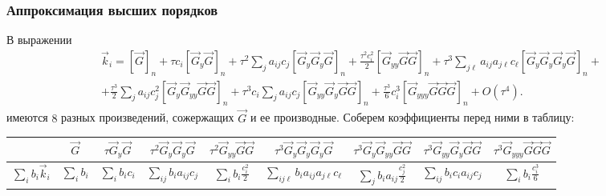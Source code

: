 \documentclass[professionalfonts,compress,unicode,aspectratio=169]{beamer}
\begin{document}
\begin{frame}\frametitle{Аппроксимация высших порядков}
	В выражении
	\begin{multline*}
	\vec k_i = [\vec G]_n + \tau c_i [\vec G_y\vec G]_n + \tau^2 \sum_j a_{ij} c_j [\vec
G_y \vec G_y \vec G]_n + \frac{\tau^2 c_i^2}{2} [\vec G_{yy} \vec G\vec G]_n +
	\tau^3 \sum_{j\ell} a_{ij} a_{j\ell} c_\ell [\vec G_y \vec G_y \vec G_y \vec
G]_n + \\ +
	\frac{\tau^3}{2} \sum_{j} a_{ij} c_j^2 [\vec G_y \vec G_{yy} \vec G \vec
G]_n +
	\tau^3 c_i \sum_{j} a_{ij} c_j [\vec G_{yy} \vec G_y \vec G \vec G]_n
	+ \frac{\tau^3}{6} c_i^3 [\vec G_{yyy} \vec G \vec G \vec G]_n + O(\tau^4).
	\end{multline*}
	имеются $8$ разных произведений, сожержащих $\vec G$ и ее производные. Соберем
коэффициенты перед ними в таблицу:

	\begin{center}
	\footnotesize
	\begin{tabular}{c|c|c|c|c|c|c|c|c}
	&$\vec G$ &
	$\tau\vec G_y \vec G$ &
	$\tau^2\vec G_y \vec G_y \vec G$ & $\tau^2 \vec G_{yy} \vec G \vec G$ &
	$\tau^3 \vec G_y \vec G_y \vec G_y \vec G$ &
	$\tau^3 \vec G_y \vec G_{yy} \vec G \vec G$ &
	$\tau^3 \vec G_{yy} \vec G_y \vec G \vec G$ &
	$\tau^3 \vec G_{yyy} \vec G \vec G \vec G$\\\hline
	$\sum_i b_i \vec k_i$ &
	$\sum_i b_i$ &
	$\sum_i b_i c_i$ &
	$\sum_{ij} b_i a_{ij} c_j$ &
	$\sum_i b_i \frac{c_i^2}{2}$ &
	$\sum_{ij\ell} b_i a_{ij} a_{j\ell} c_\ell$ &
	$\sum_{j} b_i a_{ij} \frac{c_j^2}{2}$ &
	$\sum_{ij} b_i c_i a_{ij} c_j$ &
	$\sum_i b_i \frac{c_i^3}{6}$
	\end{tabular}
	\end{center}
\end{frame}
\end{document}
